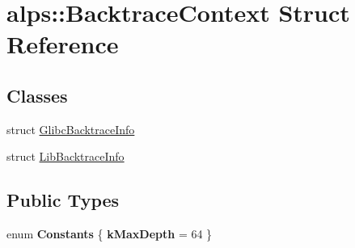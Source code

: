\hypertarget{structalps_1_1BacktraceContext}{}\section{alps\+:\+:Backtrace\+Context Struct Reference}
\label{structalps_1_1BacktraceContext}
\subsection*{Classes}
\begin{DoxyCompactItemize}
\item 
struct \hyperlink{structalps_1_1BacktraceContext_1_1GlibcBacktraceInfo}{Glibc\+Backtrace\+Info}
\item 
struct \hyperlink{structalps_1_1BacktraceContext_1_1LibBacktraceInfo}{Lib\+Backtrace\+Info}
\end{DoxyCompactItemize}
\subsection*{Public Types}
\begin{DoxyCompactItemize}
\item 
enum {\bfseries Constants} \{ {\bfseries k\+Max\+Depth} = 64
 \}\hypertarget{structalps_1_1BacktraceContext_ab3446800cb2eb7430805f58d18b5f5e8}{}\label{structalps_1_1BacktraceContext_ab3446800cb2eb7430805f58d18b5f5e8}

\end{DoxyCompactItemize}
